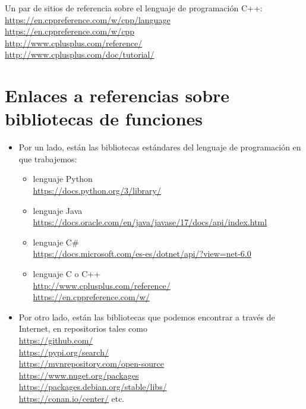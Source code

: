 \documentclass[spanish,12pt,a4paper,final,oneside]{book}
\begin{document}
Un par de sitios de referencia sobre el lenguaje de programación C++:
\\ \url{https://en.cppreference.com/w/cpp/language}
\\ \url{https://en.cppreference.com/w/cpp}
\\ \url{http://www.cplusplus.com/reference/}
\\ \url{http://www.cplusplus.com/doc/tutorial/}




\section{Enlaces a referencias sobre bibliotecas de funciones} \label{referencias_de_bibliotecas} 

\begin{itemize}

\item Por un lado, están las bibliotecas estándares del lenguaje de programación en que trabajemos:

\begin{itemize}

\item lenguaje Python
\\ \url{https://docs.python.org/3/library/}

\item lenguaje Java
\\ \url{https://docs.oracle.com/en/java/javase/17/docs/api/index.html}

\item lenguaje C\#
\\ \url{https://docs.microsoft.com/es-es/dotnet/api/?view=net-6.0}

\item lenguaje C o C++
\\ \url{http://www.cplusplus.com/reference/}
\\ \url{https://en.cppreference.com/w/}

\end{itemize}

\item Por otro lado, están las bibliotecas que podemos encontrar a través de Internet, en repositorios tales como
\\ \url{https://github.com/} 
\\ \url{https://pypi.org/search/} 
\\ \url{https://mvnrepository.com/open-source} 
\\ \url{https://www.nuget.org/packages} 
\\ \url{https://packages.debian.org/stable/libs/} 
\\ \url{https://conan.io/center/} 
etc.


\end{itemize}
\end{document}
